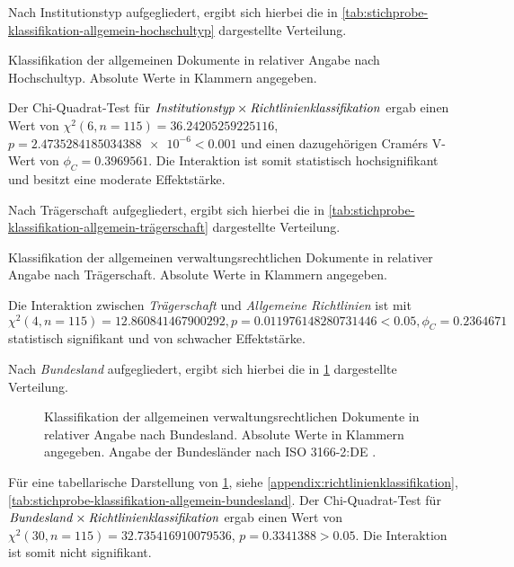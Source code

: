 Nach Institutionstyp aufgegliedert, ergibt sich hierbei die in \cref{tab:stichprobe-klassifikation-allgemein-hochschultyp} dargestellte Verteilung.
\begin{table}[!htbp]
	\caption{Klassifikation der allgemeinen Dokumente in relativer Angabe nach Hochschultyp.
    Absolute Werte in Klammern angegeben.}
    
	\label{tab:stichprobe-klassifikation-allgemein-hochschultyp}
\end{table}
Der Chi-Quadrat-Test für $\text{\textit{Institutionstyp}}\times\text{\textit{Richtlinienklassifikation}}$ ergab einen Wert von $\chi^2 (\num{6}, n=\num{115}) = \num[round-mode=places,round-precision=2]{36,24205259225116}$, $p = \num[round-mode=places,round-precision=2]{2,4735284185034388e-6}<\num{0.001}$ und einen dazugehörigen Cramérs V-Wert von $\phi_C=\num[round-mode=places,round-precision=2]{0.3969561}$.
Die Interaktion ist somit statistisch hochsignifikant und besitzt eine moderate Effektstärke.


Nach Trägerschaft aufgegliedert, ergibt sich hierbei die in \cref{tab:stichprobe-klassifikation-allgemein-trägerschaft} dargestellte Verteilung.
\begin{table}[!htbp]
	\caption{Klassifikation der allgemeinen verwaltungsrechtlichen Dokumente in relativer Angabe nach Trägerschaft. Absolute Werte in Klammern angegeben.}
    
	\label{tab:stichprobe-klassifikation-allgemein-trägerschaft}
\end{table}
Die Interaktion zwischen \textit{Trägerschaft} und \textit{Allgemeine Richtlinien} ist mit $\chi^2 (\num{4}, n=\num{115}) = \num[round-mode=places,round-precision=2]{12,860841467900292}, p = \num[round-mode=places,round-precision=2]{0,011976148280731446}<\num{0.05},\phi_C=\num[round-mode=places,round-precision=2]{0.2364671}$ statistisch signifikant und von schwacher Effektstärke.

Nach \textit{Bundesland} aufgegliedert, ergibt sich hierbei die in \cref{fig:policy-klassifikation-allgemein-absolut} dargestellte Verteilung.
\begin{figure}[!htbp]
    \centering
    \resizebox{\textwidth}{!}{}
    \caption{Klassifikation der allgemeinen verwaltungsrechtlichen Dokumente in relativer Angabe nach Bundesland. Absolute Werte in Klammern angegeben. Angabe der Bundesländer nach ISO 3166-2:DE \autocite{ISO3166}.}
    \label{fig:policy-klassifikation-allgemein-absolut}
\end{figure}
Für eine tabellarische Darstellung von \cref{fig:policy-klassifikation-allgemein-absolut}, siehe \cref{appendix:richtlinienklassifikation}, \cref{tab:stichprobe-klassifikation-allgemein-bundesland}.
Der Chi-Quadrat-Test für $\text{\textit{Bundesland}}\times\text{\textit{Richtlinienklassifikation}}$ ergab einen Wert von $\chi^2 (\num{30}, n=\num{115}) = \num[round-mode=places,round-precision=2]{32,735416910079536}$, $p = \num{0,3341388}>\num{0.05}$.
Die Interaktion ist somit nicht signifikant.

